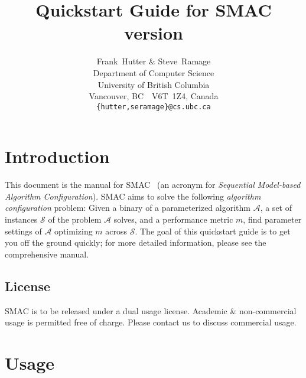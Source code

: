 \documentclass[11pt,letterpaper,twoside]{article}
\begin{document}
\title{Quickstart Guide for SMAC version  }

\author{
Frank~Hutter \& Steve~Ramage\\
Department of Computer Science\\
University of British Columbia\\
Vancouver, BC\ \ V6T~1Z4, Canada\\
\texttt{\{hutter,seramage\}@cs.ubc.ca}
}



\maketitle

\section{Introduction}

This document is the manual for SMAC~\cite{HutHooLey11-SMAC} (an acronym for \emph{Sequential Model-based Algorithm Configuration}). SMAC aims to solve the following \emph{algorithm configuration} problem: Given a binary of a parameterized algorithm $\mathcal{A}$, a set of instances $\mathcal{S}$ of the problem $\mathcal{A}$ solves, and a performance metric $m$, find parameter settings of $\mathcal{A}$ optimizing $m$ across $\mathcal{S}$.
The goal of this quickstart guide is to get you off the ground quickly; for more detailed information, please see the comprehensive manual.

\subsection{License}

SMAC is to be released under a dual usage license. 
Academic \& non-commercial usage is permitted free of charge. Please contact us to discuss commercial usage.

\section {Usage}
\end{document}
